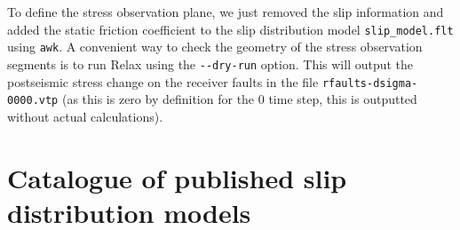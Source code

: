 \documentclass[10pt]{article}
\begin{document}
To define the stress observation plane, we just removed the slip information and added the static friction coefficient to the slip distribution model \verb'slip_model.flt' using \verb'awk'. A convenient way to check the geometry of the stress observation segments is to run Relax using the \verb'--dry-run' option. This will output the postseismic stress change on the receiver faults in the file \verb'rfaults-dsigma-0000.vtp' (as this is zero by definition for the 0 time step, this is outputted without actual calculations). 

\pagebreak

\section{Catalogue of published slip distribution models}
\end{document}
